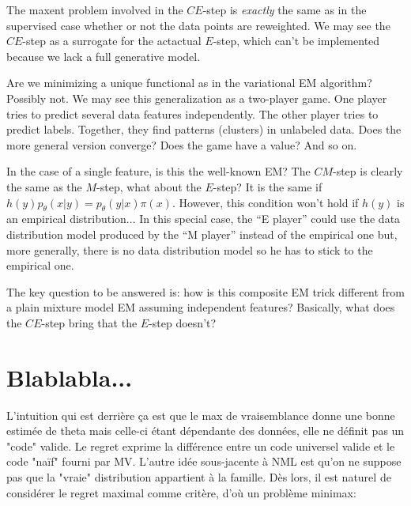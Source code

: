 \documentclass{article}
\begin{document}
The maxent problem involved in the $CE$-step is {\em exactly} the same as in the supervised case whether or not the data points are reweighted. We may see the $CE$-step as a surrogate for the actactual $E$-step, which can't be implemented because we lack a full generative model.

Are we minimizing a unique functional as in the variational EM algorithm? Possibly not. We may see this generalization as a two-player game. One player tries to predict several data features independently. The other player tries to predict labels. Together, they find patterns (clusters) in unlabeled data. Does the more general version converge? Does the game have a value? And so on.

In the case of a single feature, is this the well-known EM? The $CM$-step is clearly the same as the $M$-step, what about the $E$-step? It is the same if $h(y)p_\theta(x|y)=p_\theta(y|x)\pi(x)$. However, this condition won't hold if $h(y)$ is an empirical distribution... In this special case, the ``E player'' could use the data distribution model produced by the ``M player'' instead of the empirical one but, more generally, there is no data distribution model so he has to stick to the empirical one.

The key question to be answered is: how is this composite EM trick different from a plain mixture model EM assuming independent features? Basically, what does the $CE$-step bring that the $E$-step doesn't? 




\section{Blablabla...}


L'intuition qui est derri\`ere \c{c}a est que le max de vraisemblance donne une bonne estim\'ee de theta mais celle-ci \'etant d\'ependante des donn\'ees, elle ne d\'efinit pas un "code" valide. Le regret exprime la diff\'erence entre un code universel valide et le code "na\"if" fourni par MV. L'autre id\'ee sous-jacente \`a NML est qu'on ne suppose pas que la "vraie" distribution appartient \`a la famille. D\`es lors, il est naturel de consid\'erer le regret maximal comme crit\`ere, d'o\`u un probl\`eme minimax: 
\end{document}
